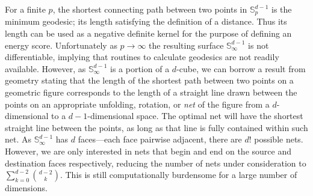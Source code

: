 For a finite $p$, the shortest connecting path between two points in ${\mathbb S}_p^{d-1}$
  is the minimum geodesic; its length satisfying the definition of a distance.  Thus its
  length can be used as a negative definite kernel for the purpose of defining an energy
  score. Unfortunately as $p\to\infty$ the resulting surface ${\mathbb S}_{\infty}^{d-1}$
  is not differentiable, implying that routines to calculate geodesics are not readily
  available.  However, as ${\mathbb S}_{\infty}^{d-1}$ is a portion of a $d$-cube, we
  can borrow a result from geometry \citep{pappas1989} stating that the length of the
  shortest path between two points on a geometric figure corresponds to the length of a
  straight line drawn between the points on an appropriate unfolding, rotation, or 
  \emph{net} of the figure from a $d$-dimensional to a $d-1$-dimensional space.  The optimal 
  net will have the shortest straight line between the points, as long as that line is fully 
  contained within such net. As ${\mathbb S}_{\infty}^{d-1}$ has $d$ faces---each face 
  pairwise adjacent, there are $d!$ possible nets.  However, we are only interested in nets 
  that begin and end on the source and destination faces respectively, reducing the number 
  of nets under consideration to $\sum_{k = 0}^{d-2}\binom{d-2}{k}$.  This is still 
  computationally burdensome for a large number of dimensions.  

